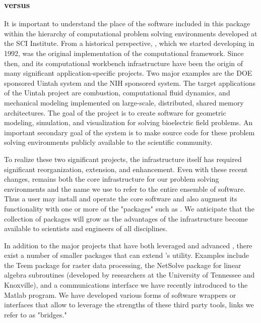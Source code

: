 \subsubsection{\SR{} versus \PSE{}}
\label{sec:srversuspse} 

It is important to understand the place of the software included in this
package within the hierarchy of computational problem solving environments
developed at the SCI Institute.  From a historical perspective, \SR{},
which we started developing in 1992, was the original implementation of the
computational
framework\cite{CRJ:Joh94c,RSM:Par95,RSM:Par95b,RSM:Par97,RSM:Par97b,CRJ:Parker99b}.
Since then, \SR{} and its computational workbench infrastructure have been
the origin of many significant application-specific projects.  Two major
examples are the DOE sponsored Uintah system \cite{RSM:Dav2000} and the NIH
sponsored \PSE{} system.  The target applications of the Uintah project are
combustion, computational fluid dynamics, and mechanical modeling
implemented on large-scale, distributed, shared memory architectures.  The
goal of the \PSE{} project is to create software for geometric modeling,
simulation, and visualization for solving bioelectric field problems.  An
important secondary goal of the \SR{} system is to make source code for
these problem solving environments publicly available to the scientific
community.

To realize these two significant projects, the \SR{} infrastructure itself
has required significant reorganization, extension, and enhancement.  Even
with these recent changes, \SR{} remains both the core infrastructure for
our problem solving environments and the name we use to refer to the entire
ensemble of software.  Thus a user may install and operate the core \SR{}
software and also augment its functionality with one or more of the
"packages" such as \PSE{}.  We anticipate that the collection of packages
will grow as the advantages of the \SR{} infrastructure become available
to scientists and engineers of all disciplines.

In addition to the major projects that have both leveraged and advanced
\SR{}, there exist a number of smaller packages that can extend \SR{}'s
utility.  Examples include the Teem package for raster data processing, the
NetSolve package for linear algebra subroutines (developed by researchers
at the University of Tennessee and Knoxville), and a communications
interface we have recently introduced to the Matlab program.  We have
developed various forms of software wrappers or interfaces that allow
\SR{} to leverage the strengths of these third party tools, links we refer
to as "bridges."

